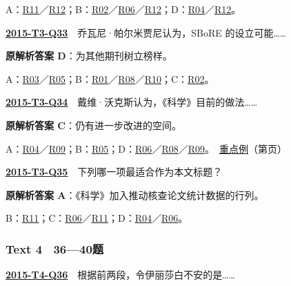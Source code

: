 \documentclass[11pt,a4paper]{article}
\begin{document}
\noindent A：\hyperref[cat-R11]{R11}／\hyperref[cat-R12]{R12}；B：\hyperref[cat-R02]{R02}／\hyperref[cat-R06]{R06}／\hyperref[cat-R12]{R12}；D：\hyperref[cat-R04]{R04}／\hyperref[cat-R12]{R12}。\par\smallskip
{}\label{idx-2015-T3-Q33}\noindent\textbf{\href{https://zj139.github.io/math-notes/english/0830618620ce5f72f771a130/\#q33}{2015-T3-Q33}}　乔瓦尼·帕尔米贾尼认为，SBoRE 的设立可能……\par\nopagebreak
\noindent\textbf{原解析答案 D}：为其他期刊树立榜样。\par\nopagebreak
\noindent A：\hyperref[cat-R03]{R03}／\hyperref[cat-R05]{R05}；B：\hyperref[cat-R01]{R01}／\hyperref[cat-R08]{R08}／\hyperref[cat-R10]{R10}；C：\hyperref[cat-R02]{R02}。\par\smallskip
{}\label{idx-2015-T3-Q34}\noindent\textbf{\href{https://zj139.github.io/math-notes/english/0830618620ce5f72f771a130/\#q34}{2015-T3-Q34}}　戴维·沃克斯认为，《科学》目前的做法……\par\nopagebreak
\noindent\textbf{原解析答案 C}：仍有进一步改进的空间。\par\nopagebreak
\noindent A：\hyperref[cat-R04]{R04}／\hyperref[cat-R09]{R09}；B：\hyperref[cat-R05]{R05}；D：\hyperref[cat-R06]{R06}／\hyperref[cat-R08]{R08}／\hyperref[cat-R09]{R09}。　\hyperref[case-2015-T3-Q34]{重点例}（第\pageref{case-2015-T3-Q34}页）\par\smallskip
{}\label{idx-2015-T3-Q35}\noindent\textbf{\href{https://zj139.github.io/math-notes/english/0830618620ce5f72f771a130/\#q35}{2015-T3-Q35}}　下列哪一项最适合作为本文标题？\par\nopagebreak
\noindent\textbf{原解析答案 A}：《科学》加入推动核查论文统计数据的行列。\par\nopagebreak
\noindent B：\hyperref[cat-R11]{R11}；C：\hyperref[cat-R06]{R06}／\hyperref[cat-R11]{R11}；D：\hyperref[cat-R04]{R04}／\hyperref[cat-R06]{R06}。\par\smallskip
{}\subsubsection{Text 4　36—40题}
\label{idx-2015-T4-Q36}\noindent\textbf{\href{https://zj139.github.io/math-notes/english/cdca5e792ad64d07196bc0ec/\#q36}{2015-T4-Q36}}　根据前两段，令伊丽莎白不安的是……\par\nopagebreak
\end{document}
